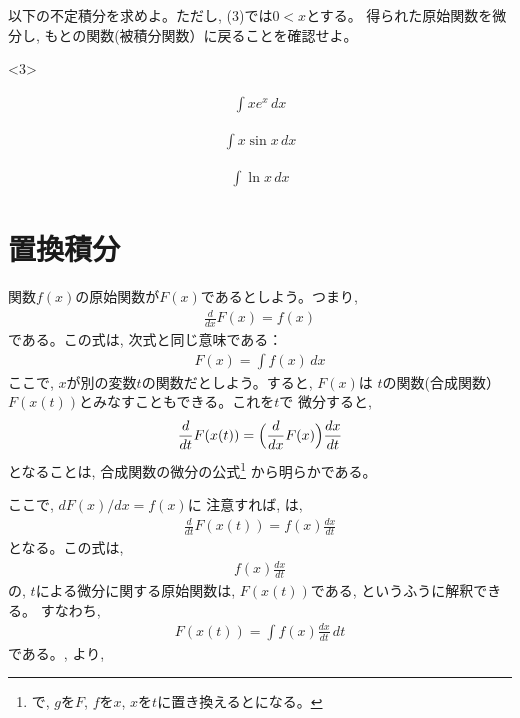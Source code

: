 \begin{q}\label{q:int_bubunsekibun} 以下の不定積分を求めよ。ただし, (3)では$0<x$とする。
得られた原始関数を微分し, もとの関数(被積分関数）に戻ることを確認せよ。

\begin{edaenumerate}<3>
\item \begin{eqnarray*}\int xe^x\, dx\end{eqnarray*}
\item \begin{eqnarray*}\int x \sin x\, dx\end{eqnarray*}
\item \begin{eqnarray*}\int \ln x\, dx\end{eqnarray*}
\end{edaenumerate}
\end{q}
\vv




\section{置換積分}

関数$f(x)$の原始関数が$F(x)$であるとしよう。つまり, 
\begin{eqnarray}\frac{d}{dx}F(x)=f(x)\end{eqnarray}
である。この式は, 次式と同じ意味である：
\begin{eqnarray}F(x)=\int f(x) \,dx\label{eq:chikan1}\end{eqnarray}
ここで, $x$が別の変数$t$の関数だとしよう。すると, $F(x)$は
$t$の関数(合成関数）$F(x(t))$とみなすこともできる。これを$t$で
微分すると, 
\begin{eqnarray}
\frac{d}{dt}F(x(t))=\Bigl(\frac{d}{dx}F(x)\Bigr)\frac{dx}{dt}\label{eq:chikansekibun3}
\end{eqnarray}
となることは, 合成関数の微分の公式\footnote{で, 
$g$を$F$, $f$を$x$, $x$を$t$に置き換えるとになる。}
から明らかである。

ここで, $dF(x)/dx=f(x)$に
注意すれば, は, 
\begin{eqnarray}
\frac{d}{dt}F(x(t))=f(x)\frac{dx}{dt}
\end{eqnarray}
となる。この式は, 
\begin{eqnarray}f(x)\frac{dx}{dt}\end{eqnarray}
の, $t$による微分に関する原始関数は, $F(x(t))$である, というふうに解釈できる。
すなわち, 
\begin{eqnarray}F(x(t))=\int f(x)\frac{dx}{dt} \,dt\label{eq:chikan2}\end{eqnarray}
である。, より, 

